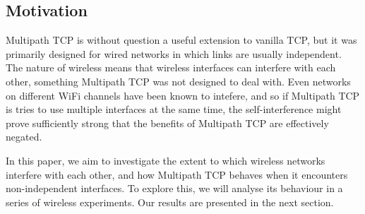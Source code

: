 \subsection{Motivation}
Multipath TCP is without question a useful extension to vanilla TCP, but it was
primarily designed for wired networks in which links are usually independent.
The nature of wireless means that wireless interfaces can interfere with each
other, something Multipath TCP was not designed to deal with. Even networks on
different WiFi channels have been known to intefere, and so if Multipath TCP is
tries to use multiple interfaces at the same time, the self-interference might
prove sufficiently strong that the benefits of Multipath TCP are effectively
negated.

In this paper, we aim to investigate the extent to which wireless networks
interfere with each other, and how Multipath TCP behaves when it encounters
non-independent interfaces. To explore this, we will analyse its behaviour in a
series of wireless experiments. Our results are presented in the next section.
